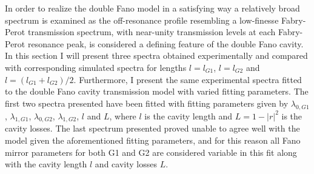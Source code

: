 In order to realize the double Fano model in a satisfying way a relatively broad spectrum is examined as the off-resonance profile resembling a low-finesse Fabry-Perot transmission spectrum, with near-unity transmission levels at each Fabry-Perot resonance peak, is considered a defining feature of the double Fano cavity. In this section I will present three spectra obtained experimentally and compared with corresponding simulated spectra for lengths $l=l_{G1}$, $l=l_{G2}$ and $l=(l_{G1} + l_{G2})/2$. Furthermore, I present the same experimental spectra fitted to the double Fano cavity transmission model with varied fitting parameters. The first two spectra presented have been fitted with fitting parameters given by $\lambda_{0,G1}$, $\lambda_{1,G1}$, $\lambda_{0,G2}$, $\lambda_{1,G2}$, $l$ and $L$, where $l$ is the cavity length and $L = 1-|r|^2$ is the cavity losses. The last spectrum presented proved unable to agree well with the model given the aforementioned fitting parameters, and for this reason all Fano mirror parameters for both G1 and G2 are considered variable in this fit along with the cavity length $l$ and cavity losses $L$.

